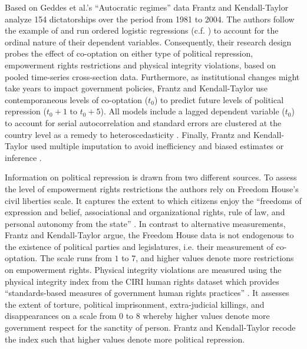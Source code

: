 Based on Geddes et al.'s \citeyearpar{Geddes.2014}
``Autocratic regimes'' data Frantz and Kendall-Taylor
analyze 154 dictatorships over the period from 1981 to 2004.
The authors follow the example of \citet{Vreeland.2008} and
run ordered logistic regressions
(c.f. \cite{Fox.2008,Fox.2011}) to account for the ordinal 
nature of their dependent variables. Consequently, their 
research design probes the effect of co-optation on either 
type of political repression, empowerment rights 
restrictions and physical integrity violations, based on 
pooled time-series cross-section data. Furthermore, as 
institutional changes might take years to impact government 
policies, Frantz and Kendall-Taylor use contemporaneous 
levels of co-optation ($t_0$) to predict future levels 
of political repression ($t_0+1$ to $t_0+5$). All models 
include a lagged dependent variable ($t_0$) to account for 
serial autocorrelation and standard errors are clustered at 
the country level as a remedy to heteroscedasticity 
\citep{Beck.1995}. Finally, Frantz and Kendall-Taylor used
multiple imputation to avoid inefficiency and biased 
estimates or inference 
\citep{King.2001b,Honaker.2010,Honaker.2011}.

Information on political repression is drawn from two 
different sources. To assess the level of empowerment 
rights restrictions the authors rely on Freedom House's 
civil liberties scale. It captures the extent to which 
citizens enjoy the ``freedoms of expression and belief, 
associational and organizational rights, rule of law, and 
personal autonomy from the state'' 
\citep{FreedomHouse.2010}. In contrast to alternative 
measurements, Frantz and Kendall-Taylor argue, the Freedom 
House data is not endogenous to the existence of political 
parties and legislatures, i.e. their measurement of 
co-optation. The scale runs from $1$ to $7$, and higher 
values denote more restrictions on empowerment rights. 
Physical integrity violations are measured using the 
physical integrity index from the CIRI human rights dataset 
which provides ``standards-based measures of government 
human rights practices'' \citep[402]{Cingranelli.2010b}. 
It assesses the extent of torture, political imprisonment, 
extra-judicial killings, and disappearances on a scale from
$0$ to $8$ whereby higher values denote more government respect 
for the sanctity of person. Frantz and 
Kendall-Taylor recode the index such that higher values 
denote more political repression.

